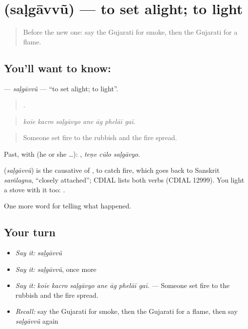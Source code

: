 \section[\texorpdfstring{\gu{સળગાવવું} (saḷgāvvũ)}{સળગાવવું (saḷgāvvũ)}]{ (saḷgāvvũ) — to set alight; to light}

\label{lesson:GU-C300-salgavvu}



\begin{quote}
Before the new one: say the Gujarati for smoke, then the Gujarati for a flame.
\end{quote}

\subsection*{You'll want to know: }
\textbf{} — \emph{saḷgāvvũ} — \textquotedblleft{}to set alight; to light\textquotedblright{}.

\begin{quote}
      .
\end{quote}

\begin{quote}
\emph{koīe kacro saḷgāvyo ane āg phelāī gaī.}
\end{quote}

\begin{quote}
Someone set fire to the rubbish and the fire spread.
\end{quote}

Past, with  (he or she …):   , \emph{teṇe cūlo saḷgāvyo}.

\begin{cousinweb}
\textbf{} (\emph{saḷgāvvũ}) is the causative of \textbf{}, to catch fire, which goes back to Sanskrit \emph{saṁlagna}, \textquotedblleft{}closely attached\textquotedblright{}; CDIAL lists both verbs (CDIAL 12999). You light a stove with it too: \textbf{ }.
\end{cousinweb}

\begin{grammarlens}[title={What you've built}]
One more word for telling what happened.
\end{grammarlens}

\subsection*{Your turn}
\begin{itemize}
\raggedright
  \item \emph{Say it:} \emph{saḷgāvvũ}
  \item \emph{Say it:} \emph{saḷgāvvũ}, once more
  \item \emph{Say it:} \emph{koīe kacro saḷgāvyo ane āg phelāī gaī.} — Someone set fire to the rubbish and the fire spread.
  \item \emph{Recall:} say the Gujarati for smoke, then the Gujarati for a flame, then say \emph{saḷgāvvũ} again
\end{itemize}

